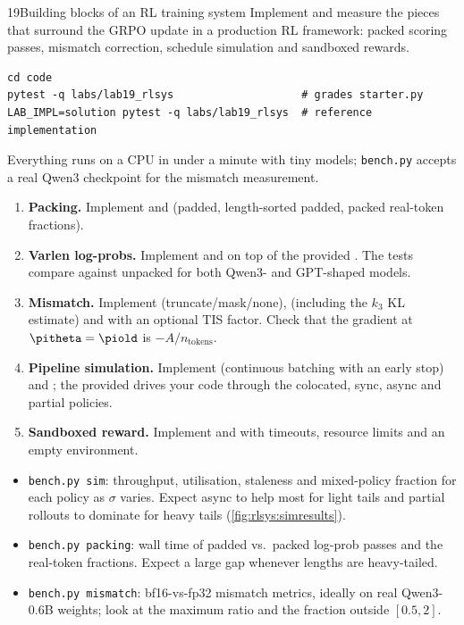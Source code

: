 \begin{labbox}{19}{Building blocks of an RL training system}
Implement and measure the pieces that surround the GRPO update in a production RL framework:
packed scoring passes, mismatch correction, schedule simulation and sandboxed rewards.

\begin{lstlisting}[style=shell]
cd code
pytest -q labs/lab19_rlsys                    # grades starter.py
LAB_IMPL=solution pytest -q labs/lab19_rlsys  # reference implementation
\end{lstlisting}
Everything runs on a CPU in under a minute with tiny models; \texttt{bench.py} accepts a real
Qwen3 checkpoint for the mismatch measurement.

\begin{enumerate}
\item \textbf{Packing.} Implement  and  (padded,
length-sorted padded, packed real-token fractions).
\item \textbf{Varlen log-probs.} Implement  and
 on top of the provided . The tests
compare against unpacked  for both Qwen3- and GPT-shaped models.
\item \textbf{Mismatch.} Implement  (truncate/mask/none),
 (including the $k_3$ KL estimate) and  with an
optional TIS factor. Check that the gradient at $\pitheta=\piold$ is $-A/n_{\text{tokens}}$.
\item \textbf{Pipeline simulation.} Implement  (continuous batching with
an early stop) and ; the provided  drives your code
through the colocated, sync, async and partial policies.
\item \textbf{Sandboxed reward.} Implement  and 
with timeouts, resource limits and an empty environment.
\end{enumerate}

\begin{itemize}
\item \texttt{bench.py sim}: throughput, utilisation, staleness and mixed-policy fraction for
each policy as $\sigma$ varies. Expect async to help most for light tails and partial rollouts
to dominate for heavy tails (\cref{fig:rlsys:simresults}).
\item \texttt{bench.py packing}: wall time of padded vs.\ packed log-prob passes and the
real-token fractions. Expect a large gap whenever lengths are heavy-tailed.
\item \texttt{bench.py mismatch}: bf16-vs-fp32 mismatch metrics, ideally on real Qwen3-0.6B
weights; look at the maximum ratio and the fraction outside $[0.5, 2]$.
\end{itemize}


\end{labbox}
